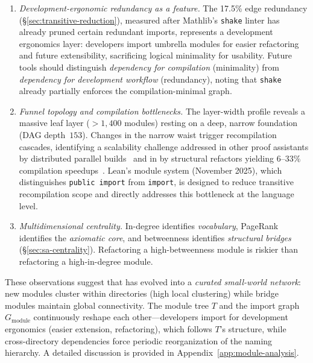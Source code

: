 \begin{enumerate}
    \item \textit{Development-ergonomic redundancy as a feature.} The 17.5\% edge redundancy (\S\ref{sec:transitive-reduction}), measured after Mathlib's \texttt{shake} linter has already pruned certain redundant imports, represents a development ergonomics layer: developers import umbrella modules for easier refactoring and future extensibility, sacrificing logical minimality for usability. Future tools should distinguish \textit{dependency for compilation} (minimality) from \textit{dependency for development workflow} (redundancy), noting that \texttt{shake} already partially enforces the compilation-minimal graph.

    \item \textit{Funnel topology and compilation bottlenecks.} The layer-width profile reveals a massive leaf layer ($>1{,}400$ modules) resting on a deep, narrow foundation (DAG depth~$153$). Changes in the narrow waist trigger recompilation cascades, identifying a scalability challenge addressed in other proof assistants by distributed parallel builds~\cite{huch2024} and in  by structural refactors yielding $6$--$33\%$ compilation speedups~\cite{baanen2025}. Lean's module system (November 2025), which distinguishes \texttt{public import} from \texttt{import}, is designed to reduce transitive recompilation scope and directly addresses this bottleneck at the language level.

    \item \textit{Multidimensional centrality.} In-degree identifies \textit{vocabulary}, PageRank identifies the \textit{axiomatic core}, and betweenness identifies \textit{structural bridges} (\S\ref{sec:sa-centrality}). Refactoring a high-betweenness module is riskier than refactoring a high-in-degree module.
\end{enumerate}

\noindent
These observations suggest that  has evolved into a \textit{curated small-world network}: new modules cluster within directories (high local clustering) while bridge modules maintain global connectivity. The module tree $T$ and the import graph $G_{\mathrm{module}}$ continuously reshape each other---developers import for development ergonomics (easier extension, refactoring), which follows $T$'s structure, while cross-directory dependencies force periodic reorganization of the naming hierarchy. A detailed discussion is provided in Appendix~\ref{app:module-analysis}.

